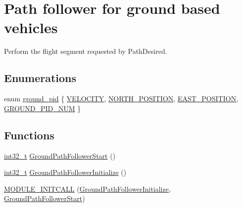 \hypertarget{group___ground_path_follower}{\section{Path follower for ground based vehicles}
\label{group___ground_path_follower}
}


Perform the flight segment requested by Path\-Desired.  


\subsection*{Enumerations}
\begin{DoxyCompactItemize}
\item 
enum \hyperlink{group___ground_path_follower_ga1223527343fc1b6614c7abf83ed7d170}{ground\-\_\-pid} \{ \hyperlink{group___ground_path_follower_gga1223527343fc1b6614c7abf83ed7d170a06e15744a8bd69fceeeb39ab3614b3f6}{V\-E\-L\-O\-C\-I\-T\-Y}, 
\hyperlink{group___ground_path_follower_gga1223527343fc1b6614c7abf83ed7d170a3f46558976ca7c653cc8c08475bcab2a}{N\-O\-R\-T\-H\-\_\-\-P\-O\-S\-I\-T\-I\-O\-N}, 
\hyperlink{group___ground_path_follower_gga1223527343fc1b6614c7abf83ed7d170a16d8665516d2ff93c39520ff3a7aaa10}{E\-A\-S\-T\-\_\-\-P\-O\-S\-I\-T\-I\-O\-N}, 
\hyperlink{group___ground_path_follower_gga1223527343fc1b6614c7abf83ed7d170a69d05de5d51b2fc72b5f8122e58f0033}{G\-R\-O\-U\-N\-D\-\_\-\-P\-I\-D\-\_\-\-N\-U\-M}
 \}
\end{DoxyCompactItemize}
\subsection*{Functions}
\begin{DoxyCompactItemize}
\item 
\hyperlink{group___n_a_m_e_gafd12020da5a235dfcf0c3c748fb5baed}{int32\-\_\-t} \hyperlink{group___ground_path_follower_ga844090ee19407a7f78fe00806c3d66a7}{Ground\-Path\-Follower\-Start} ()
\item 
\hyperlink{group___n_a_m_e_gafd12020da5a235dfcf0c3c748fb5baed}{int32\-\_\-t} \hyperlink{group___ground_path_follower_ga025f961b3b70a3ee5098c756f7f3507d}{Ground\-Path\-Follower\-Initialize} ()
\item 
\hyperlink{group___ground_path_follower_ga899760a5bd6b260314dc492e50590aae}{M\-O\-D\-U\-L\-E\-\_\-\-I\-N\-I\-T\-C\-A\-L\-L} (\hyperlink{group___ground_path_follower_ga025f961b3b70a3ee5098c756f7f3507d}{Ground\-Path\-Follower\-Initialize}, \hyperlink{group___ground_path_follower_ga844090ee19407a7f78fe00806c3d66a7}{Ground\-Path\-Follower\-Start})
\end{DoxyCompactItemize}


